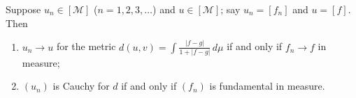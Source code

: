 Suppose $u_n \in [\mathcal{M}]$ ($n = 1, 2, 3, \ldots$) and $u \in [\mathcal{M}]$; say $u_n = [f_n]$ and $u = [f]$. Then
\begin{enumerate}
\item[(i)] $u_n \to u$ for the metric $d(u, v) = \int \frac{|f - g|}{1 + |f - g|} \, d\mu$ if and only if $f_n \to f$ in measure;
\item[(ii)] $(u_n)$ is Cauchy for $d$ if and only if $(f_n)$ is fundamental in measure.
\end{enumerate}
